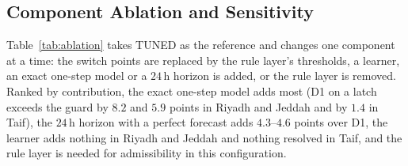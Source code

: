 \documentclass[pdflatex,sn-mathphys-num,iicol]{sn-jnl}
\theoremstyle{thmstyleone}\newtheorem{proposition}{Proposition}\newtheorem{corollary}{Corollary}
\theoremstyle{thmstyletwo}\newtheorem{remark}{Remark}\newtheorem{observation}{Observation}
\theoremstyle{thmstylethree}\newtheorem{definition}{Definition}
\begin{document}
\subsection{Component Ablation and Sensitivity}
\label{subsec:abl_component}

Table~\ref{tab:ablation} takes TUNED as the reference and changes one component at a time: the switch points are replaced by the rule layer's thresholds, a learner, an exact one-step model or a $24\,$h horizon is added, or the rule layer is removed. Ranked by contribution, the exact one-step model adds most (D1 on a latch exceeds the guard by $8.2$ and $5.9$ points in Riyadh and Jeddah and by $1.4$ in Taif), the $24\,$h horizon with a perfect forecast adds $4.3$--$4.6$ points over D1, the learner adds nothing in Riyadh and Jeddah and nothing resolved in Taif, and the rule layer is needed for admissibility in this configuration.
\end{document}
